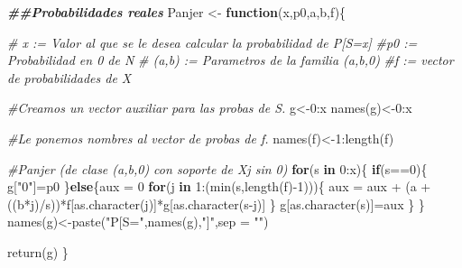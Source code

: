 \documentclass[
]{article}
\newenvironment{Shaded}{\begin{snugshade}}{\end{snugshade}}
\newcommand{\AttributeTok}[1]{\textcolor[rgb]{0.77,0.63,0.00}{#1}}
\newcommand{\CommentTok}[1]{\textcolor[rgb]{0.56,0.35,0.01}{\textit{#1}}}
\newcommand{\ControlFlowTok}[1]{\textcolor[rgb]{0.13,0.29,0.53}{\textbf{#1}}}
\newcommand{\DecValTok}[1]{\textcolor[rgb]{0.00,0.00,0.81}{#1}}
\newcommand{\DocumentationTok}[1]{\textcolor[rgb]{0.56,0.35,0.01}{\textbf{\textit{#1}}}}
\newcommand{\FunctionTok}[1]{\textcolor[rgb]{0.00,0.00,0.00}{#1}}
\newcommand{\NormalTok}[1]{#1}
\newcommand{\OtherTok}[1]{\textcolor[rgb]{0.56,0.35,0.01}{#1}}
\newcommand{\SpecialCharTok}[1]{\textcolor[rgb]{0.00,0.00,0.00}{#1}}
\newcommand{\StringTok}[1]{\textcolor[rgb]{0.31,0.60,0.02}{#1}}
\begin{document}
\begin{Shaded}
\begin{Highlighting}[]
\DocumentationTok{\#\#Probabilidades reales}
\NormalTok{Panjer }\OtherTok{\textless{}{-}} \ControlFlowTok{function}\NormalTok{(x,p0,a,b,f)\{}
  
  \CommentTok{\# x := Valor al que se le desea calcular la probabilidad de P[S=x]}
  \CommentTok{\#p0 := Probabilidad en 0 de N}
  \CommentTok{\# (a,b) := Parametros de la familia (a,b,0)}
  \CommentTok{\#f := vector de probabilidades de X}
  
  \CommentTok{\#Creamos un vector auxiliar para las probas de S.}
\NormalTok{  g}\OtherTok{\textless{}{-}}\DecValTok{0}\SpecialCharTok{:}\NormalTok{x}
  \FunctionTok{names}\NormalTok{(g)}\OtherTok{\textless{}{-}}\DecValTok{0}\SpecialCharTok{:}\NormalTok{x}
  
  \CommentTok{\#Le ponemos nombres al vector de probas de f.}
  \FunctionTok{names}\NormalTok{(f)}\OtherTok{\textless{}{-}}\DecValTok{1}\SpecialCharTok{:}\FunctionTok{length}\NormalTok{(f)}
  
  \CommentTok{\#Panjer (de clase (a,b,0) con soporte de Xj sin 0)}
  \ControlFlowTok{for}\NormalTok{(s }\ControlFlowTok{in} \DecValTok{0}\SpecialCharTok{:}\NormalTok{x)\{}
    \ControlFlowTok{if}\NormalTok{(s}\SpecialCharTok{==}\DecValTok{0}\NormalTok{)\{}
\NormalTok{      g[}\StringTok{"0"}\NormalTok{]}\OtherTok{=}\NormalTok{p0}
\NormalTok{    \}}\ControlFlowTok{else}\NormalTok{\{aux }\OtherTok{=} \DecValTok{0}
    \ControlFlowTok{for}\NormalTok{(j }\ControlFlowTok{in} \DecValTok{1}\SpecialCharTok{:}\NormalTok{(}\FunctionTok{min}\NormalTok{(s,}\FunctionTok{length}\NormalTok{(f)}\SpecialCharTok{{-}}\DecValTok{1}\NormalTok{)))\{}
\NormalTok{      aux }\OtherTok{=}\NormalTok{ aux }\SpecialCharTok{+}\NormalTok{ (a }\SpecialCharTok{+}\NormalTok{ ((b}\SpecialCharTok{*}\NormalTok{j)}\SpecialCharTok{/}\NormalTok{s))}\SpecialCharTok{*}\NormalTok{f[}\FunctionTok{as.character}\NormalTok{(j)]}\SpecialCharTok{*}\NormalTok{g[}\FunctionTok{as.character}\NormalTok{(s}\SpecialCharTok{{-}}\NormalTok{j)]}
\NormalTok{    \}}
\NormalTok{    g[}\FunctionTok{as.character}\NormalTok{(s)]}\OtherTok{=}\NormalTok{aux}
\NormalTok{    \}}
\NormalTok{  \}}
  \FunctionTok{names}\NormalTok{(g)}\OtherTok{\textless{}{-}}\FunctionTok{paste}\NormalTok{(}\StringTok{"P[S="}\NormalTok{,}\FunctionTok{names}\NormalTok{(g),}\StringTok{"]"}\NormalTok{,}\AttributeTok{sep =} \StringTok{""}\NormalTok{)}
  
  \FunctionTok{return}\NormalTok{(g)}
\NormalTok{\}}


\end{Highlighting}
\end{Shaded}
\end{document}
